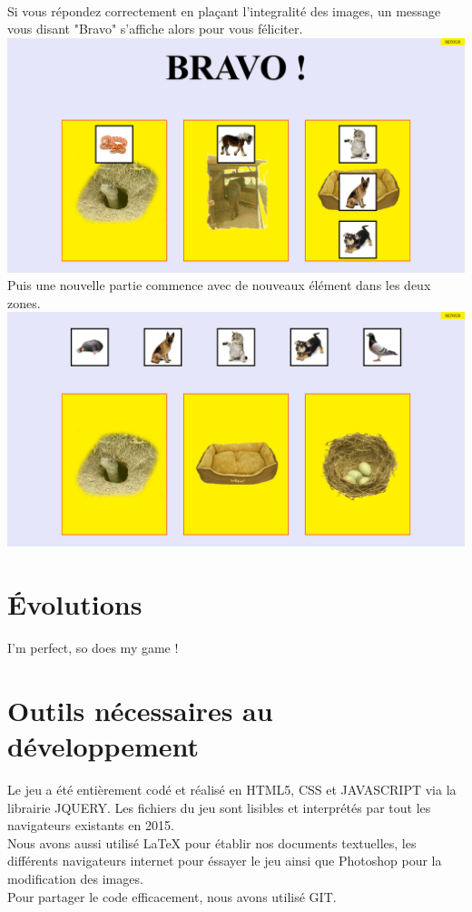 \documentclass{article}
\begin{document}
\vspace{0.5cm}\\
Si vous r\'epondez correctement en pla\c{c}ant l'integralit\'e des images, un message vous disant "Bravo" s'affiche alors pour vous f\'eliciter.
\vspace{0.5cm}\\
\includegraphics[width=1.0\textwidth]{zone6}
\vspace{0.5cm}\\
Puis une nouvelle partie commence avec de nouveaux \'el\'ement dans les deux zones.
\vspace{0.5cm}\\
\includegraphics[width=1.0\textwidth]{zone7}
\vspace{0.5cm}\\

\newpage
\section{\'Evolutions}

I'm perfect, so does my game !

\newpage
\section{Outils n\'ecessaires au d\'eveloppement}

\hspace*{0.6cm}Le jeu a \'et\'e enti\`erement cod\'e et r\'ealis\'e en HTML5, CSS et JAVASCRIPT via la librairie JQUERY. Les fichiers du jeu sont lisibles et interpr\'et\'es par tout les navigateurs existants en 2015.\\
\hspace*{0.6cm}Nous avons aussi utilis\'e LaTeX pour \'etablir nos documents textuelles, les diff\'erents navigateurs internet pour \'essayer le jeu ainsi que Photoshop pour la modification des images.\\
Pour partager le code efficacement, nous avons utilis\'e GIT.
\end{document}
